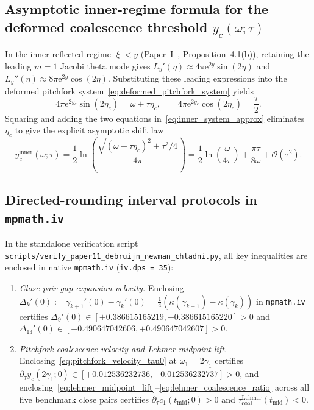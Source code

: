\documentclass[11pt,reqno]{amsart}
\theoremstyle{definition}
\theoremstyle{remark}
\numberwithin{equation}{section}
\newcommand{\ee}{\mathrm{e}}
\begin{document}
\subsection{Asymptotic inner-regime formula for the deformed coalescence threshold $y_c(\omega;\tau)$}\label{app:inner_yc}

In the inner reflected regime $|\xi| < y$ (Paper~I~\cite{missiaen2026paper1}, Proposition~4.1(b)), retaining the leading $m = 1$ Jacobi theta mode gives $L_y'(\eta) \approx 4\pi\ee^{2y}\sin(2\eta)$ and $L_y''(\eta) \approx 8\pi\ee^{2y}\cos(2\eta)$. Substituting these leading expressions into the deformed pitchfork system~\eqref{eq:deformed_pitchfork_system} yields
\begin{equation}\label{eq:inner_system_approx}
4\pi\ee^{2y_c}\sin(2\eta_c) = \omega + \tau\eta_c, \qquad 4\pi\ee^{2y_c}\cos(2\eta_c) = \frac{\tau}{2}.
\end{equation}
Squaring and adding the two equations in~\eqref{eq:inner_system_approx} eliminates $\eta_c$ to give the explicit asymptotic shift law
\begin{equation}\label{eq:inner_yc_shift}
y_c^{\mathrm{inner}}(\omega;\tau) = \frac{1}{2}\ln\!\left(\frac{\sqrt{(\omega + \tau\eta_c)^2 + \tau^2/4}}{4\pi}\right) = \frac{1}{2}\ln\!\left(\frac{\omega}{4\pi}\right) + \frac{\pi\tau}{8\omega} + \mathcal{O}(\tau^2).
\end{equation}

\subsection{Directed-rounding interval protocols in \texttt{mpmath.iv}}\label{app:interval}

In the standalone verification script \texttt{scripts/verify\_paper11\_debruijn\_newman\_chladni.py}, all key inequalities are enclosed in native \texttt{mpmath.iv} (\texttt{iv.dps = 35}):
\begin{enumerate}[label=\textup{(\arabic*)},leftmargin=2.2em]
\item \textit{Close-pair gap expansion velocity.} Enclosing $\Delta_k'(0) := \gamma_{k+1}'(0) - \gamma_k'(0) = \frac{1}{4}(\kappa(\gamma_{k+1}) - \kappa(\gamma_k))$ in \texttt{mpmath.iv} certifies $\Delta_9'(0) \in [+0.386615165219, +0.386615165220] > 0$ and $\Delta_{13}'(0) \in [+0.490647042606, +0.490647042607] > 0$.
\item \textit{Pitchfork coalescence velocity and Lehmer midpoint lift.} Enclosing~\eqref{eq:pitchfork_velocity_tau0} at $\omega_1 = 2\gamma_1$ certifies $\partial_\tau y_c(2\gamma_1;0) \in [+0.012536232736, +0.012536232737] > 0$, and enclosing~\eqref{eq:lehmer_midpoint_lift}--\eqref{eq:lehmer_coalescence_ratio} across all five benchmark close pairs certifies $\partial_\tau c_1(t_{\mathrm{mid}};0) > 0$ and $\tau_{\mathrm{coal}}^{\mathrm{Lehmer}}(t_{\mathrm{mid}}) < 0$.
\end{enumerate}
\end{document}
